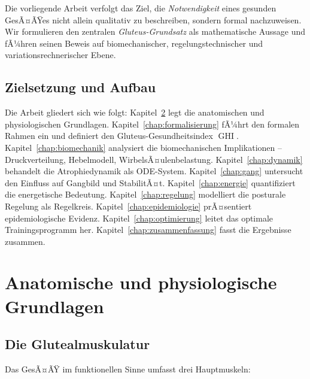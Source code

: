 ﻿\documentclass[12pt,a4paper]{report}
\theoremstyle{plain}
\theoremstyle{definition}
\theoremstyle{remark}
\DeclareMathOperator{\GHI}{GHI}
\begin{document}
	Die vorliegende Arbeit verfolgt das Ziel, die \emph{Notwendigkeit} eines
	gesunden GesÃ¤ÃŸes nicht allein qualitativ zu beschreiben, sondern formal
	nachzuweisen. Wir formulieren den zentralen \emph{Gluteus-Grundsatz}
	als mathematische Aussage und fÃ¼hren seinen Beweis auf biomechanischer,
	regelungstechnischer und variationsrechnerischer Ebene.
	
	\section{Zielsetzung und Aufbau}
	
	Die Arbeit gliedert sich wie folgt:
	Kapitel~\ref{chap:anatomie} legt die anatomischen und physiologischen Grundlagen.
	Kapitel~\ref{chap:formalisierung} fÃ¼hrt den formalen Rahmen ein und definiert
	den Gluteus-Gesundheitsindex $\GHI$.
	Kapitel~\ref{chap:biomechanik} analysiert die biomechanischen Implikationen
	-- Druckverteilung, Hebelmodell, WirbelsÃ¤ulenbelastung.
	Kapitel~\ref{chap:dynamik} behandelt die Atrophiedynamik als ODE-System.
	Kapitel~\ref{chap:gang} untersucht den Einfluss auf Gangbild und StabilitÃ¤t.
	Kapitel~\ref{chap:energie} quantifiziert die energetische Bedeutung.
	Kapitel~\ref{chap:regelung} modelliert die posturale Regelung als Regelkreis.
	Kapitel~\ref{chap:epidemiologie} prÃ¤sentiert epidemiologische Evidenz.
	Kapitel~\ref{chap:optimierung} leitet das optimale Trainingsprogramm her.
	Kapitel~\ref{chap:zusammenfassung} fasst die Ergebnisse zusammen.
	
	\chapter{Anatomische und physiologische Grundlagen}
	\label{chap:anatomie}
	
	\section{Die Glutealmuskulatur}
	
	Das GesÃ¤ÃŸ im funktionellen Sinne umfasst drei Hauptmuskeln:
	
\end{document}
